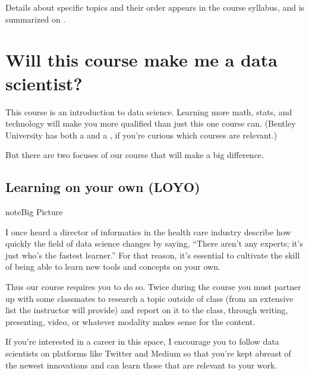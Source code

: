 \documentclass[letterpaper,10pt,english]{sphinxmanual}
\begin{document}
Details about specific topics and their order appears in the course syllabus, and is summarized on {\hyperref[\detokenize{intro::doc}]{}}.


\section{Will this course make me a data scientist?}
\label{\detokenize{chapter-1-intro-to-data-science:will-this-course-make-me-a-data-scientist}}
This course is an introduction to data science.  Learning more math, stats, and technology will make you more qualified than just this one course can.  (Bentley University has both a  and a , if you’re curious which courses are relevant.)

But there are two focuses of our course that will make a big difference.


\subsection{Learning on your own (LOYO)}
\label{\detokenize{chapter-1-intro-to-data-science:learning-on-your-own-loyo}}
\begin{sphinxadmonition}{note}{Big Picture}

I once heard a director of informatics in the health care industry describe how quickly the field of data science changes by saying, “There aren’t any experts; it’s just who’s the fastest learner.”  For that reason, it’s essential to cultivate the skill of being able to learn new tools and concepts on your own.
\end{sphinxadmonition}

Thus our course requires you to do so.  Twice during the course you must partner up with some classmates to research a topic outside of class (from an extensive list the instructor will provide) and report on it to the class, through writing, presenting, video, or whatever modality makes sense for the content.

If you’re interested in a career in this space, I encourage you to follow data scientists on platforms like Twitter and Medium so that you’re kept abreast of the newest innovations and can learn those that are relevant to your work.
\end{document}
